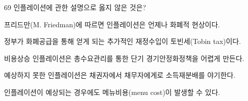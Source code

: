 \begin{question}{69}
인플레이션에 관한 설명으로 옳지 않은 것은?
\begin{choices}
  \item 프리드만(M. Friedman)에 따르면 인플레이션은 언제나 화폐적 현상이다.
  \item 정부가 화폐공급을 통해 얻게 되는 추가적인 재정수입이 토빈세(Tobin tax)이다.
  \item 비용상승 인플레이션은 총수요관리를 통한 단기 경기안정화정책을 어렵게 만든다.
  \item 예상하지 못한 인플레이션은 채권자에서 채무자에게로 소득재분배를 야기한다.
  \item 인플레이션이 예상되는 경우에도 메뉴비용(menu cost)이 발생할 수 있다.
\end{choices}
\end{question}
